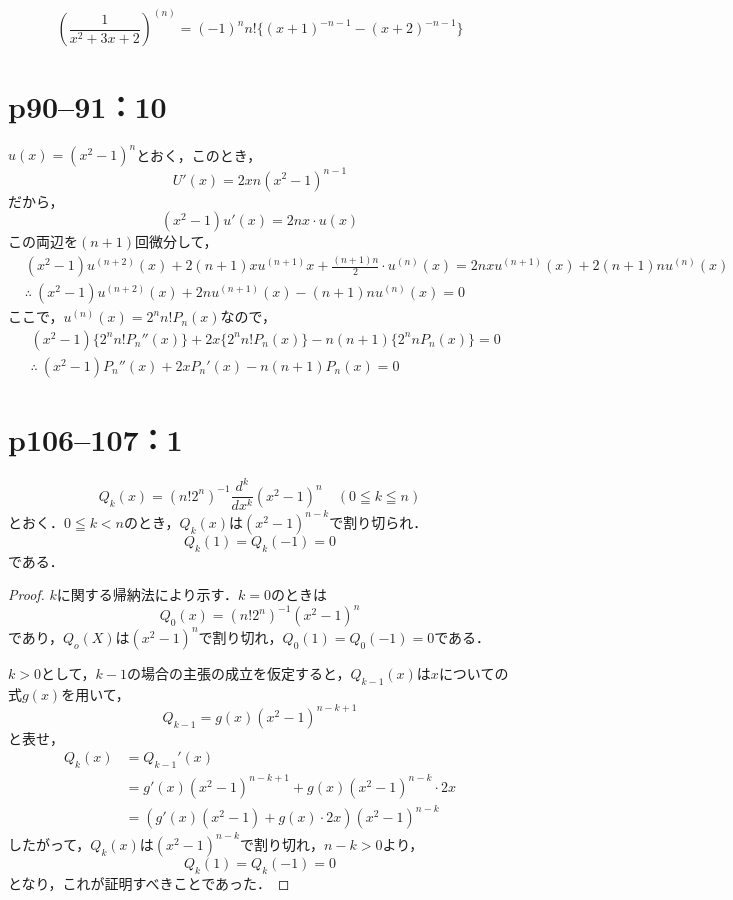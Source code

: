 \begin{tanswer}
  \[
    \left(   \frac{1}{x^2+3x+2} \right)^{(n)} = (-1)^n n! \{ (x+1)^{-n-1} - (x+2)^{-n-1} \}
  \]
\end{tanswer}



\section*{p90--91：10}

\begin{tproof}
  $u(x)= (x^2-1)^n$とおく，このとき，
  \[
    U'(x)= 2x n(x^2-1)^{n-1}
  \]
  だから，
  \[
    (x^2-1) u'(x)=2nx \cdot u(x)
  \]
  この両辺を$(n+1)$回微分して，
  \begin{align*}
     & (x^2-1)u^{(n+2)}(x)+2(n+1)x u^{(n+1)} x + \frac{(n+1)n}{2} \cdot u^{(n)} (x) = 2nx u^{(n+1)}(x) + 2(n+1) n u^{(n)}(x) \\
     & \therefore ~(x^2-1)u^{(n+2)}(x) + 2n u^{(n+1)}(x)-(n+1)n u^{(n)}(x)=0
  \end{align*}
  ここで，$ u^{(n)} (x)= 2^n n! P_n (x)$なので，
  \begin{align*}
     & (x^2 -1) \{ 2^n n! P_n ''(x) \} +2x \{ 2^n n! P_n (x) \} -n(n+1) \{ 2^n n P_n(x) \} =0 \\
     & \therefore ~ (x^2-1) P_n ''(x)+2x P_n '(x) -n(n+1) P_n (x)=0
  \end{align*}
\end{tproof}


\section*{p106--107：1}

\begin{lemma}{}{}
  \[
    Q_k (x)= (n! 2^n)^{-1} \frac{d^k}{dx^k} (x^2-1)^n \quad (0 \leqq k \leqq n)
  \]
  とおく．$0 \leqq k <n$のとき，$Q_k (x)$は$(x^2-1)^{n-k}$で割り切られ．
  \[
    Q_k (1)= Q_k(-1)=0
  \]
  である．
\end{lemma}

\begin{proof}
  $k$に関する帰納法により示す．$k=0$のときは
  \[
    Q_0(x)= (n! 2^n)^{-1} (x^2-1)^n
  \]
  であり，$Q_o(X)$は$(x^2-1)^n$で割り切れ，$Q_0(1)=Q_0(-1)=0$である．

  $k>0$として，$k-1$の場合の主張の成立を仮定すると，$Q_{k-1}(x)$は$x$についての式$g(x)$を用いて，
  \[
    Q_{k-1} = g(x)(x^2-1)^{n-k+1}
  \]
  と表せ，
  \begin{align*}
    Q_k (x) & =Q_{k-1}' (x)                                        \\
            & = g'(x)(x^2-1)^{n-k+1} + g(x) (x^2-1)^{n-k} \cdot 2x \\
            & =(g'(x)(x^2-1)+g(x) \cdot 2x) (x^2-1)^{n-k}
  \end{align*}
  したがって，$Q_k(x)$は$(x^2-1)^{n-k}$で割り切れ，$n-k >0$より，
  \[
    Q_k (1)= Q_k(-1)=0
  \]
  となり，これが証明すべきことであった．
\end{proof}

